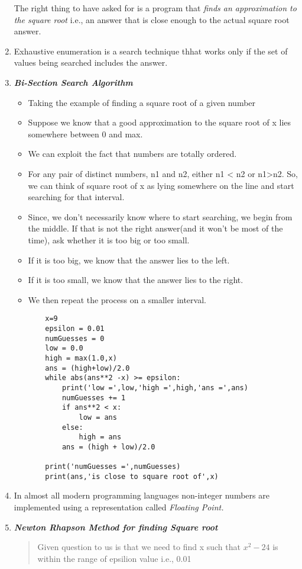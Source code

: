 \documentclass[11pt]{article}
\begin{document}
\begin{enumerate}
        The right thing to have asked for is a program that \textit{finds an approximation to the square root} i.e., an answer that is close enough to the actual square root answer.
        \item Exhaustive enumeration is a search technique thhat works only if the set of values being searched includes the answer.
        \item \textbf{ \textit{Bi-Section Search Algorithm}}
            \begin{itemize}
                \item Taking the example of finding a square root of a given number
                \item Suppose we know that a good approximation to the square root of x lies somewhere between 0 and max.
                \item We can exploit the fact that numbers are totally ordered.
                \item For any pair of distinct numbers, n1 and n2, either n1 < n2 or n1>n2. So, we can think of square root of x as lying somewhere on the line and start searching for that interval.
                \item Since, we don't necessarily know where to start searching, we begin from the middle. If that is not the right answer(and it won't be most of the time), ask whether it is too big or too small. 
                \item If it is too big, we know that the answer lies to the left.
                \item If it is too small, we know that the answer lies to the right.
                \item We then repeat the process on a smaller interval.
\begin{verbatim}
    x=9
    epsilon = 0.01
    numGuesses = 0
    low = 0.0
    high = max(1.0,x)
    ans = (high+low)/2.0
    while abs(ans**2 -x) >= epsilon:
        print('low =',low,'high =',high,'ans =',ans)
        numGuesses += 1
        if ans**2 < x:
            low = ans
        else:
            high = ans
        ans = (high + low)/2.0

    print('numGuesses =',numGuesses)
    print(ans,'is close to square root of',x)
\end{verbatim}
            \end{itemize}
            \item In almost all modern programming languages non-integer numbers are implemented using a representation called \textit{Floating Point.}
            \item \textbf{ \textit{Newton Rhapson Method for finding Square root}}
            \begin{quote}
                Given question to us is that we need to find x such that \(x^2-24\) is within the range of epsilion value i.e., 0.01
                

\end{quote}
\end{enumerate}
\end{document}

